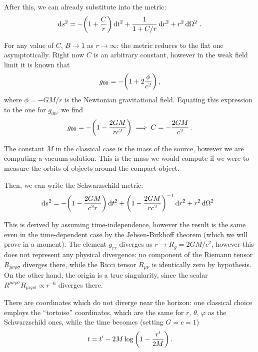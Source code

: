 \documentclass[main.tex]{subfiles}
\begin{document}
After this, we can already substitute into the metric: 
%
\begin{align}
\dd{s^2} = - \qty(1 + \frac{C}{r}) \dd{t^2} 
+ \frac{1}{1 + C/r} \dd{r^2} + r^2 \dd{\Omega^2}
\,.
\end{align}

For any value of \(C\), \(B \to 1\) as \(r \to \infty \): the metric reduces to the flat one asymptotically. 
Right now \(C\) is an arbitrary constant, however in the weak field limit it is known that 
%
\begin{align}
g_{00} = - \qty(1 + 2 \frac{\phi }{c^2})
\,,
\end{align}
%
where \(\phi = - GM / r\) is the Newtonian gravitational field.
Equating this expression to the one for \(g_{00} \), we find 
%
\begin{align}
g_{00} = - \qty(1 - \frac{2 GM}{rc^2})
\implies C = - \frac{2GM}{c^2}
\,.
\end{align}

The constant \(M\) in the classical case is the mass of the source, however we are computing a vacuum solution. This is the mass we would compute if we were to measure the orbits of objects around the compact object.


Then, we can write the Schwarzschild metric: 
%
\begin{align}
\dd{s^2} = - \qty(1 - \frac{2GM}{c^2r}) \dd{t^2}
+ \qty(1 - \frac{2GM}{rc^2})^{-1} \dd{r^2} + r^2 \dd{\Omega^2}
\,.
\end{align}

This is derived by assuming time-independence, however the result is the same even in the time-dependent case by the Jebsen-Birkhoff theorem (which we will prove in a moment). 
The element \(g_{rr} \) diverges as \(r \to R_g = 2GM/c^2\), however this does not represent any physical divergence: no component of the Riemann tensor \(R_{\mu \nu \rho \sigma }\) diverges there, while the Ricci tensor \(R_{\mu \nu }\) is identically zero by hypothesis.
On the other hand, the origin is a true singularity, since the scalar \(R^{\mu \nu \rho \sigma } R_{\mu \nu \rho \sigma } \propto r^{-6}\) diverges there. 

There are coordinates which do not diverge near the horizon: one classical choice employs the ``tortoise'' coordinates, which are the same for \(r\), \(\theta \), \(\varphi \) as the Schwarzschild ones, while the time becomes (setting \(G = c =  1\))
%
\begin{align}
t = t' - 2M \log \qty(1 - \frac{r'}{2M})
\,.
\end{align}
\end{document}
